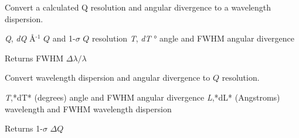 \documentclass[letterpaper,10pt,english]{sphinxmanual}
\begin{document}
\begin{fulllineitems}
\label{api/resolution:refl1d.resolution.dQdT2dLoL}
Convert a calculated Q resolution and angular divergence to a
wavelength dispersion.

\emph{Q}, \emph{dQ} Å$^{\text{-1}}$  $Q$ and 1-$\sigma$ $Q$ resolution
\emph{T}, \emph{dT} ° angle and FWHM angular divergence

Returns FWHM $\Delta\lambda/\lambda$

\end{fulllineitems}


\begin{fulllineitems}
\label{api/resolution:refl1d.resolution.dTdL2dQ}
Convert wavelength dispersion and angular divergence to $Q$ resolution.

\emph{T},*dT*  (degrees) angle and FWHM angular divergence
\emph{L},*dL*  (Angstroms) wavelength and FWHM wavelength dispersion

Returns 1-$\sigma$ $\Delta Q$

\end{fulllineitems}

\end{document}
